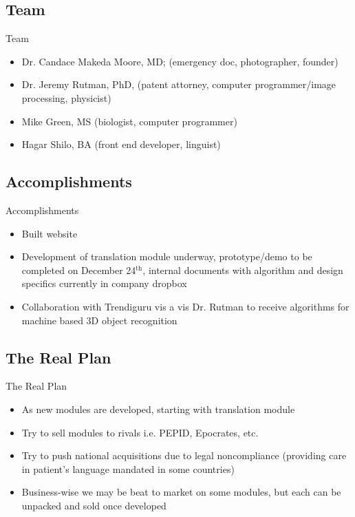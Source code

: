 \documentclass[presentation]{beamer}
\begin{document}
\subsection{Team}
\label{sec-1-7}
\begin{frame}[label=sec-1-7-1]{Team}
\begin{itemize}
\item Dr. Candace Makeda Moore, MD; (emergency doc, photographer, founder)
\item Dr. Jeremy Rutman, PhD, (patent attorney, computer programmer/image
processing, physicist)
\item Mike Green, MS (biologist, computer programmer)
\item Hagar Shilo, BA (front end developer, linguist)
\end{itemize}
\end{frame}

\subsection{Accomplishments}
\label{sec-1-8}
\begin{frame}[label=sec-1-8-1]{Accomplishments}
\begin{itemize}
\item Built website
\item Development of translation module underway, prototype/demo to be
completed on December 24$^{\text{th}}$, internal documents with algorithm and
design specifics currently in company dropbox
\item Collaboration with Trendiguru vis a vis Dr. Rutman to receive
algorithms for machine based 3D object recognition
\end{itemize}
\end{frame}

\subsection{The Real Plan}
\label{sec-1-9}
\begin{frame}[label=sec-1-9-1]{The Real Plan}
\begin{itemize}
\item As new modules are developed, starting with translation module
\item Try to sell modules to rivals i.e. PEPID, Epocrates, etc.
\item Try to push national acquisitions due to legal noncompliance
(providing care in patient's language mandated in some countries)
\item Business-wise we may be beat to market on some modules, but each can
be unpacked and sold once developed
\end{itemize}
\end{frame}
\end{document}
